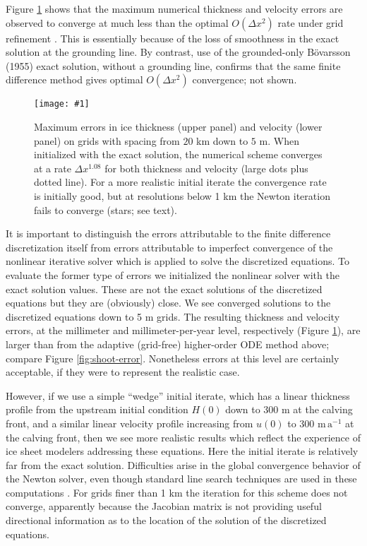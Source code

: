 \documentclass[twocolumn,letterpaper]{igs}
\renewcommand{\dh}{\fontencoding{T1}\selectfont{\symbol{240}}}
\newcommand{\onecol}[1]{\texttt{[image: \#1]}}
\newcommand{\citebod}{B\"o\dh varsson (1955)\nocite{Bodvardsson}\xspace}
\begin{document}
Figure \ref{fig:convmarine} shows that the maximum numerical thickness and velocity errors are observed to converge at much less than the optimal $O(\Delta x^2)$ rate under grid refinement \citep{MortonMayers}.  This is essentially because of the loss of smoothness in the exact solution at the grounding line.  By contrast, use of the grounded-only \citebod exact solution, without a grounding line, confirms that the same finite difference method gives optimal $O(\Delta x^2)$ convergence; not shown.

\begin{figure}[ht]
\onecol{convmarine}
\caption{Maximum errors in ice thickness (upper panel) and velocity (lower panel) on grids with spacing from $20$ km down to $5$ m.  When initialized with the exact solution, the numerical scheme converges at a rate $\Delta x^{1.08}$ for both thickness and velocity (large dots plus dotted line).  For a more realistic initial iterate the convergence rate is initially good, but at resolutions below 1 km the Newton iteration fails to converge (stars; see text).} \label{fig:convmarine}
\end{figure}

It is important to distinguish the errors attributable to the finite difference discretization itself from errors attributable to imperfect convergence of the nonlinear iterative solver which is applied to solve the discretized equations.  To evaluate the former type of errors we initialized the nonlinear solver with the exact solution values.  These are not the exact solutions of the discretized equations but they are (obviously) close.  We see converged solutions to the discretized equations down to 5 m grids.  The resulting thickness and velocity errors, at the millimeter and millimeter-per-year level, respectively (Figure \ref{fig:convmarine}), are larger than from the adaptive (grid-free) higher-order ODE method above; compare Figure \ref{fig:shoot-error}.  Nonetheless errors at this level are certainly acceptable, if they were to represent the realistic case.

However, if we use a simple ``wedge'' initial iterate, which has a linear thickness profile from the upstream initial condition $H(0)$ down to 300 m at the calving front, and a similar linear velocity profile increasing from $u(0)$ to 300 $\text{m}\,\text{a}^{-1}$ at the calving front, then we see more realistic results which reflect the experience of ice sheet modelers addressing these equations.  Here the initial iterate is relatively far from the exact solution.  Difficulties arise in the global convergence behavior of the Newton solver, even though standard line search techniques are used in these computations \citep{Kelley}.  For grids finer than 1 km the iteration for this scheme does not converge, apparently because the Jacobian matrix is not providing useful directional information as to the location of the solution of the discretized equations.
\end{document}
